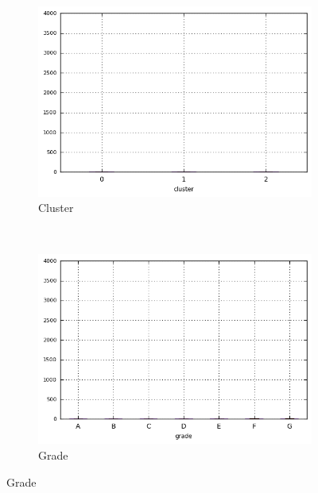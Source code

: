 \begin{anexosenv}
\begin{figure}[!ht]
\begin{subfigure}[t]{0.45\textwidth}
        \end{subfigure}
\end{figure}


\begin{figure}[ht!]
    \centering
        \caption{\emph{Boxplots} de collection\textunderscore recovery\textunderscore fee }
        \begin{subfigure}[t]{0.45\textwidth}
            \centering
            \caption{Cluster }

            \centerline{\includegraphics[width=1\textwidth]{img/collection_recovery_fee_by_cluster}}
        \end{subfigure}%
        ~ 
        \begin{subfigure}[t]{0.45\textwidth}
            \centering
            \caption{Grade}
   
            \centerline{\includegraphics[width=1\textwidth]{img/collection_recovery_fee_by_grade}}


\end{subfigure}
\end{figure}
\end{anexosenv}
